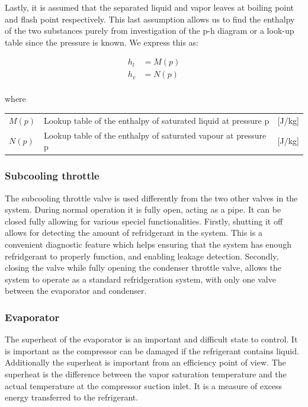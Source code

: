 Lastly, it is assumed that the separated liquid and vapor leaves at boiling point and flash point respectively. This last assumption allows us to find the enthalpy of the two substances purely from investigation of the p-h diagram or a look-up table since the pressure is known. We express this as:

\begin{align}
	h_{l}  & = M(p)\\
	h_{v}  & = N(p)\\
\end{align}

where

\begin{center}
	\begin{tabular}{l p{8cm} l}
		$M(p)$			&  Lookup table of the enthalpy of saturated liquid	at pressure p		& [\si{J}/\si{kg}]\\
		$N(p)$			&  Lookup table of the enthalpy of saturated vapour	at pressure p		& [\si{J}/\si{kg}] \\

	\end{tabular}
\end{center}

\subsubsection{Subcooling throttle}
The subcooling throttle valve is used differently from the two other valves in the system. During normal operation it is fully open, acting as a pipe. It can be closed fully allowing for various speciel functionalities. Firstly, shutting it off allows for detecting the amount of refridgerant in the system. This is a convenient diagnostic feature which helps ensuring that the system has enough refridgerant to properly function, and enabling leakage detection. Secondly, closing the valve while fully opening the condenser throttle valve, allows the system to operate as a standard refridgeration system, with only one valve between the evaporator and condenser.


\subsubsection{Evaporator}
The superheat of the evaporator is an important and difficult state to control. It is important as the compressor can be damaged if the refrigerant contains liquid. Additionally the superheat is important from an efficiency point of view.
The superheat is the difference between the vapor saturation temperature and the actual temperature at the compressor suction inlet. It is a measure of excess energy transferred to the refrigerant.

